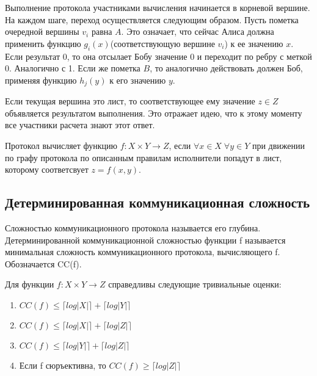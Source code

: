 \documentclass[12pt]{article}
\begin{document}
Выполнение протокола участниками вычисления начинается в корневой вершине.
На каждом шаге, переход осуществляется следующим образом. Пусть пометка очередной вершины $v_i$ равна $A$. Это означает, что сейчас Алиса должна применить функцию $g_i(x)$(соответствующую вершине $v_i$) к ее значению $x$. Если результат 0, то она отсылает Бобу значение 0 и переходит по ребру с меткой 0. Аналогично с 1.
Если же пометка $B$, то аналогично действовать должен Боб, применяя функцию $h_j(y)$ к его значению $y$.

Если текущая вершина это лист, то соответствующее ему значение $z \in Z$ объявляется результатом выполнения.
Это отражает идею, что к этому моменту все участники расчета знают этот ответ.

\begin{Def}
Протокол вычисляет функцию $ f \colon X \times Y \rightarrow Z $, \linebreak
если $ \forall x \in X \; \forall y \in Y $ при движении по графу протокола по описанным правилам исполнители попадут в лист, которому соответсвует $z=f(x,y)$.
\end{Def}

\subsection{Детерминированная коммуникационная сложность}

\begin{Def}
Сложностью коммуникационного протокола называется его глубина.
Детерминированной коммуникационной сложностью функции f называется минимальная сложность коммуникационного протокола, вычисляющего f. Обозначается CC(f).
\end{Def}

\begin{Statement}
Для функции $ f \colon X \times Y \rightarrow Z $ справедливы следующие тривиальные оценки:
    \begin{enumerate}
        \item
        $
            CC(f) \leq
            \lceil log|X| \rceil +
            \lceil log|Y| \rceil
        $
        \item
        $
            CC(f) \leq
            \lceil log|X| \rceil +
            \lceil log|Z| \rceil
        $
        \item
        $
            CC(f) \leq
            \lceil log|Y| \rceil +
            \lceil log|Z| \rceil
        $
        \item
        Если f сюръективна, то $ CC(f) \geq \lceil log|Z| \rceil $
    \end{enumerate}
\end{Statement}
\end{document}
